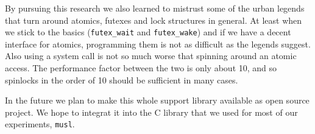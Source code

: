 By pursuing this research we also learned to mistrust some of the
urban legends that turn around atomics, futexes and lock structures in
general. At least when we stick to the basics (\texttt{futex\_wait} and
\texttt{futex\_wake}) and if we have a decent interface for atomics,
programming them is not as difficult as the legends suggest. Also
using a system call is not so much worse that spinning around an
atomic access. The performance factor between the two is only about
10, and so spinlocks in the order of 10 should be sufficient in many
cases.

In the future we plan to make this whole support library available as
open source project. We hope to integrat it into the C library that we
used for most of our experiments, \texttt{musl}.


